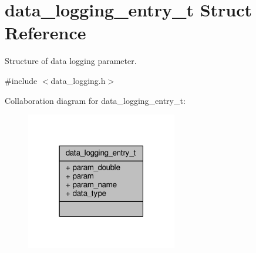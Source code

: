 \hypertarget{structdata__logging__entry__t}{\section{data\+\_\+logging\+\_\+entry\+\_\+t Struct Reference}
\label{structdata__logging__entry__t}
}


Structure of data logging parameter.  




{\ttfamily \#include $<$data\+\_\+logging.\+h$>$}



Collaboration diagram for data\+\_\+logging\+\_\+entry\+\_\+t\+:
\nopagebreak
\begin{figure}[H]
\begin{center}
\leavevmode
\includegraphics[width=187pt]{structdata__logging__entry__t__coll__graph}
\end{center}
\end{figure}

